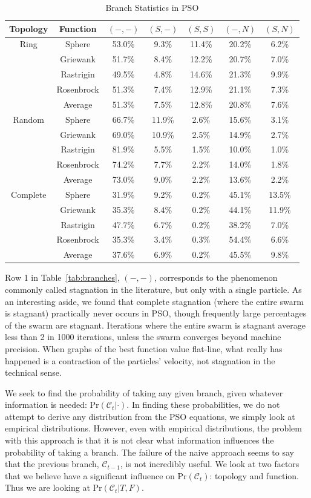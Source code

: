 \documentclass[journal,letterpaper]{IEEEtran}
\providecommand{\caseset}{\ensuremath{\mathcal{C}}}
\providecommand{\casexn}{\ensuremath{(S,-)}}
\providecommand{\casexx}{\ensuremath{(S,S)}}
\providecommand{\casepn}{\ensuremath{(-,-)}}
\providecommand{\casepN}{\ensuremath{(-,N)}}
\providecommand{\casexN}{\ensuremath{(S,N)}}
\providecommand{\prob}{\ensuremath{\mathrm{Pr}}}
\begin{document}
\begin{table}[ht]
  \caption{Branch Statistics in PSO}
  \label{tab:stats}
  \centering
  \scriptsize
  \begin{tabular}{c|c|c|c|c|c|c}
	Topology&Function&\casepn&\casexn&\casexx&\casepN&\casexN\\
	\hline
	\hline
	Ring&Sphere&53.0\%&9.3\%&11.4\%&20.2\%&6.2\%\\
	&Griewank&51.7\%&8.4\%&12.2\%&20.7\%&7.0\%\\
	&Rastrigin&49.5\%&4.8\%&14.6\%&21.3\%&9.9\%\\
	&Rosenbrock&51.3\%&7.4\%&12.9\%&21.1\%&7.3\%\\
	\cline{2-7}
	&Average&{51.3\%}&{7.5\%}&{12.8\%}&{20.8\%}&
	{7.6\%}\\
	\hline
	\hline
	Random&Sphere&66.7\%&11.9\%&2.6\%&15.6\%&3.1\%\\
	&Griewank&69.0\%&10.9\%&2.5\%&14.9\%&2.7\%\\
	&Rastrigin&81.9\%&5.5\%&1.5\%&10.0\%&1.0\%\\
	&Rosenbrock&74.2\%&7.7\%&2.2\%&14.0\%&1.8\%\\
	\cline{2-7}
	&Average&{73.0\%}&{9.0\%}&{2.2\%}&{13.6\%}&
	{2.2\%}\\
	\hline
	\hline
	Complete&Sphere&31.9\%&9.2\%&0.2\%&45.1\%&13.5\%\\
	&Griewank&35.3\%&8.4\%&0.2\%&44.1\%&11.9\%\\
	&Rastrigin&47.7\%&6.7\%&0.2\%&38.2\%&7.0\%\\
	&Rosenbrock&35.3\%&3.4\%&0.3\%&54.4\%&6.6\%\\
	\cline{2-7}
	&Average&{37.6\%}&{6.9\%}&{0.2\%}&{45.5\%}&
	{9.8\%}\\
	\hline
  \end{tabular}
\end{table}

Row 1 in Table~\ref{tab:branches}, \casepn, corresponds to the phenomenon
commonly called stagnation in the literature, but only with a single particle.
As an interesting aside, we found that complete stagnation (where the entire
swarm is stagnant) practically never occurs in PSO, though frequently large
percentages of the swarm are stagnant.  Iterations where the entire swarm is
stagnant average less than 2 in 1000 iterations, unless the swarm converges
beyond machine precision.  When graphs of the best function value flat-line,
what really has happened is a contraction of the particles' velocity, not
stagnation in the technical sense.  

We seek to find the probability of taking any given branch, given whatever
information is needed: $\prob(\caseset_t|\cdot)$.  In finding these
probabilities, we do not attempt to derive any distribution from the PSO
equations, we simply look at empirical distributions.  However, even with
empirical distributions, the problem with this approach is that it is not clear
what information influences the probability of taking a branch.  The failure of
the naive approach seems to say that the previous branch, $\caseset_{t-1}$, is
not incredibly useful.  We look at two factors that we believe have a
significant influence on $\prob(\caseset_t)$: topology and function.  Thus we
are looking at $\prob(\caseset_t|T,F)$.
\end{document}
